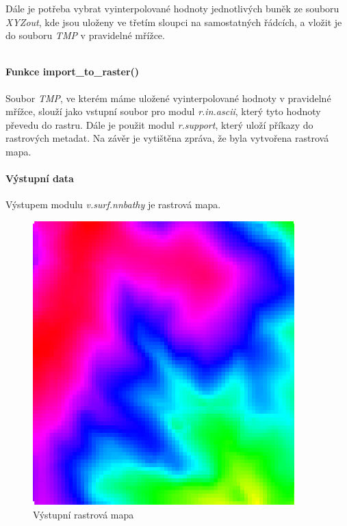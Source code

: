 \documentclass[12pt,a4paper]{article}
\begin{document}
Dále je potřeba vybrat vyinterpolované hodnoty jednotlivých buněk ze souboru \emph{XYZout}, kde jsou uloženy ve třetím sloupci na samostatných řádcích, a vložit je do souboru \emph{TMP} v pravidelné mřížce.

\lstset{basicstyle=\footnotesize}
\begin{lstlisting}
\end{lstlisting}

\paragraph{Funkce import\_to\_raster()}
Soubor \emph{TMP}, ve kterém máme uložené vyinterpolované hodnoty v pravidelné mřížce, slouží jako vstupní soubor pro modul \emph{r.in.ascii}, který tyto hodnoty převedu do rastru. Dále je použit modul \emph{r.support}, který uloží příkazy do rastrových metadat. Na závěr je vytištěna zpráva, že byla vytvořena rastrová mapa.


\paragraph{Výstupní data}
Výstupem modulu \emph{v.surf.nnbathy} je rastrová mapa.
\begin{figure}[h!]
\centering
\includegraphics[width=0.9\textwidth]{img/vystup_rast_map.png}
\caption{Výstupní rastrová mapa}
\label{fig:vystup_rast_map}
\end{figure}
\end{document}
